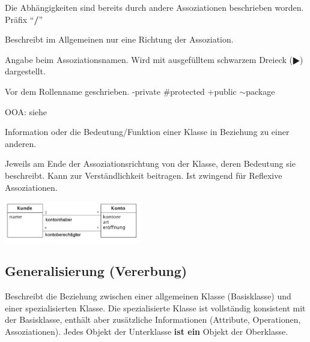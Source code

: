 \begin{description}
    \item[abgeleitete Assoziation] 
      Die Abhängigkeiten sind bereits durch andere Assoziationen beschrieben worden.
      Präfix "`\textbf{/}"'
    \item[Assoziationsname] 
      Beschreibt im Allgemeinen nur eine Richtung der Assoziation. 
    \item[Leserichtung] 
      Angabe beim Assoziationsnamen. Wird mit ausgefülltem schwarzem Dreieck ($\RHD$) dargestellt.
    \item[Sichtbarkeit] 
      Vor dem Rollenname geschrieben. -private \#protected +public $\sim$package
    \item[Eigenschaftswert] 
      OOA: siehe 
      
    \parbox{8cm}{
      \item[Rolle]
        Information oder die Bedeutung/Funktion einer Klasse in Beziehung zu einer anderen.
      \item[Rollenname]
        Jeweils am Ende der Assoziationsrichtung von der Klasse, 
        deren Bedeutung sie beschreibt. Kann zur Verständlichkeit beitragen. Ist zwingend für Reflexive Assoziationen.}
    \hspace{0.5cm}
    \parbox{6cm}{\includegraphics[width=6cm]{./bilder/Rolle.png}}
  \end{description}

\subsection{Generalisierung (Vererbung) }
  Beschreibt die Beziehung zwischen einer allgemeinen Klasse (Basisklasse) und
  einer spezialisierten Klasse. Die spezialisierte Klasse ist vollständig
  konsistent mit der Basisklasse, enthält aber zusätzliche Informationen
  (Attribute, Operationen, Assoziationen). Jedes Objekt der Unterklasse \textbf{ist ein} 
  Objekt der Oberklasse.
   	

